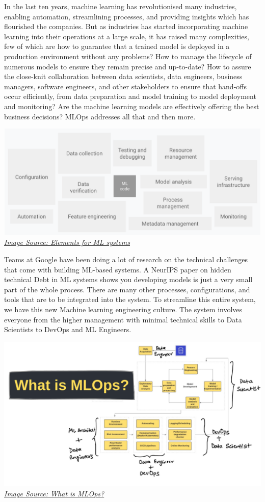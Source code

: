 \documentclass[
  letterpaper,
  DIV=11,
  numbers=noendperiod]{scrartcl}
\begin{document}
In the last ten years, machine learning has revolutionised many
industries, enabling automation, streamlining processes, and providing
insights which has flourished the companies. But as industries has
started incorporating machine learning into their operations at a large
scale, it has raised many complexities, few of which are how to
guarantee that a trained model is deployed in a production environment
without any problems? How to manage the lifecycle of numerous models to
ensure they remain precise and up-to-date? How to assure the close-knit
collaboration between data scientists, data engineers, business
managers, software engineers, and other stakeholders to ensure that
hand-offs occur efficiently, from data preparation and model training to
model deployment and monitoring? Are the machine learning models are
effectively offering the best business decisions? MLOps addresses all
that and then more.

\includegraphics{Introduction to MLOps_files/mediabag/mlops-continuous-del.png}
\emph{\href{https://cloud.google.com/architecture/mlops-continuous-delivery-and-automation-pipelines-in-machine-learning}{Image
Source: Elements for ML systems}}

Teams at Google have been doing a lot of research on the technical
challenges that come with building ML-based systems. A NeurIPS paper on
hidden technical Debt in ML systems shows you developing models is just
a very small part of the whole process. There are many other processes,
configurations, and tools that are to be integrated into the system. To
streamline this entire system, we have this new Machine learning
engineering culture. The system involves everyone from the higher
management with minimal technical skills to Data Scientists to DevOps
and ML Engineers.

\includegraphics{Introduction to MLOps_files/mediabag/mlops_thumb.png}
\emph{\href{https://www.freecodecamp.org/news/what-is-mlops-machine-learning-operations-explained/}{Image
Source: What is MLOps?}}
\end{document}
